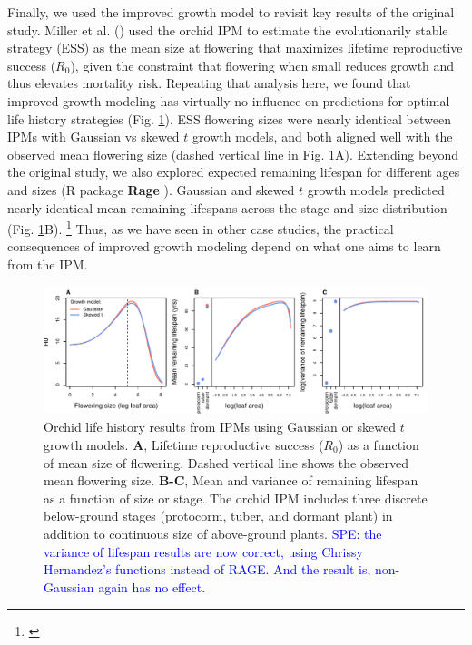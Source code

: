 \documentclass[12pt]{article}
\newcommand{\tom}[2]{{\color{red}{#1}}\footnote{\textit{\color{red}{#2}}}}
\newcommand{\comment}{\textcolor{blue}}
\begin{document}
Finally, we used the improved growth model to revisit key results of the original study. 
Miller et al. (\citeyear{miller2012evolutionary}) used the orchid IPM to estimate the evolutionarily stable strategy (ESS) as the mean size at flowering that maximizes lifetime reproductive success ($R_0$), given the constraint that flowering when small reduces growth and thus elevates mortality risk. 
Repeating that analysis here, we found that improved growth modeling has virtually no influence on predictions for optimal life history strategies (Fig. \ref{fig:orchid_ESS}).
ESS flowering sizes were nearly identical between IPMs with Gaussian vs skewed $t$ growth models, and both aligned well with the observed mean flowering size (dashed vertical line in Fig. \ref{fig:orchid_ESS}A). 
Extending beyond the original study, we also explored expected remaining lifespan for different ages and sizes (R package \textbf{Rage} \citep{jones2022rcompadre}). 
Gaussian and skewed $t$ growth models predicted nearly identical mean remaining lifespans across the stage and size distribution (Fig. \ref{fig:orchid_ESS}B).
\tom{However, the skewed $t$ model predicted consistently greater variance in remaining lifespan, nearly 10\% greater at some sizes.}{Do not believe this result! I have left it here as a placeholder because I would like to do this correctly. But I think there are problems with Rage's life\_expect\_var() function. The predicted variance declines linearly with matrix dimension.} 
Thus, as we have seen in other case studies, the practical consequences of improved growth modeling depend on what one aims to learn from the IPM. 

\begin{figure}[tbp]
	\centering
	\includegraphics[width=1.0\textwidth]{figures/orchis_life_history.pdf}
	\caption{Orchid life history results from IPMs using Gaussian or skewed $t$ growth models. \textbf{A}, Lifetime reproductive success ($R_0$) as a function of mean size of flowering. Dashed vertical line shows the observed mean flowering size. \textbf{B-C}, Mean and variance of remaining lifespan as a function of size or stage. The orchid IPM includes three discrete below-ground stages (protocorm, tuber, and dormant plant) in addition to continuous size of above-ground plants.
	\comment{SPE: the variance of lifespan results are now correct, using Chrissy Hernandez's functions instead of RAGE. And the result is, non-Gaussian again has no effect.} 
	}
	\label{fig:orchid_ESS}
\end{figure} 
\end{document}
